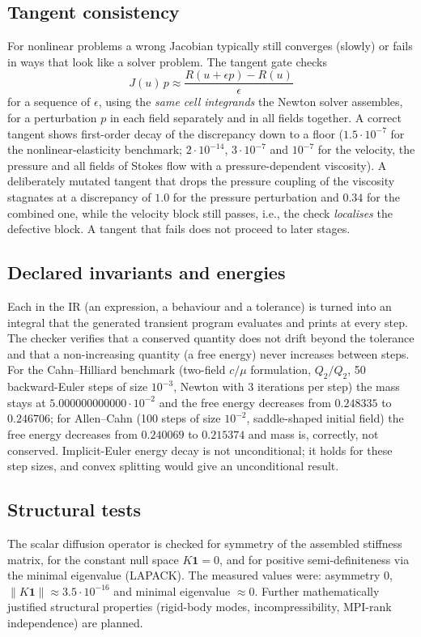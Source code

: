 \subsection{Tangent consistency}
For nonlinear problems a wrong Jacobian typically still converges (slowly) or fails in ways that look like a solver problem. The tangent gate checks
\begin{equation}
J(u)\,p\approx\frac{R(u+\epsilon p)-R(u)}{\epsilon}
\end{equation}
for a sequence of $\epsilon$, using the \emph{same cell integrands} the Newton solver assembles, for a perturbation $p$ in each field separately and in all fields together. A correct tangent shows first-order decay of the discrepancy down to a floor ($1.5\cdot10^{-7}$ for the nonlinear-elasticity benchmark; $2\cdot10^{-14}$, $3\cdot10^{-7}$ and $10^{-7}$ for the velocity, the pressure and all fields of Stokes flow with a pressure-dependent viscosity). A deliberately mutated tangent that drops the pressure coupling of the viscosity stagnates at a discrepancy of $1.0$ for the pressure perturbation and $0.34$ for the combined one, while the velocity block still passes, i.e., the check \emph{localises} the defective block. A tangent that fails does not proceed to later stages.

\subsection{Declared invariants and energies}
Each  in the IR (an expression, a behaviour and a tolerance) is turned into an integral that the generated transient program evaluates and prints at every step. The checker verifies that a conserved quantity does not drift beyond the tolerance and that a non-increasing quantity (a free energy) never increases between steps. For the Cahn--Hilliard benchmark (two-field $c/\mu$ formulation, $Q_2/Q_2$, 50 backward-Euler steps of size $10^{-3}$, Newton with 3 iterations per step) the mass stays at $5.000000000000\cdot10^{-2}$ and the free energy decreases from $0.248335$ to $0.246706$; for Allen--Cahn (100 steps of size $10^{-2}$, saddle-shaped initial field) the free energy decreases from $0.240069$ to $0.215374$ and mass is, correctly, not conserved. Implicit-Euler energy decay is not unconditional; it holds for these step sizes, and convex splitting would give an unconditional result.

\subsection{Structural tests}
The scalar diffusion operator is checked for symmetry of the assembled stiffness matrix, for the constant null space $K\mathbf 1=0$, and for positive semi-definiteness via the minimal eigenvalue (LAPACK). The measured values were: asymmetry $0$, $\|K\mathbf 1\|\approx3.5\cdot10^{-16}$ and minimal eigenvalue $\approx0$. Further mathematically justified structural properties (rigid-body modes, incompressibility, MPI-rank independence) are planned.

